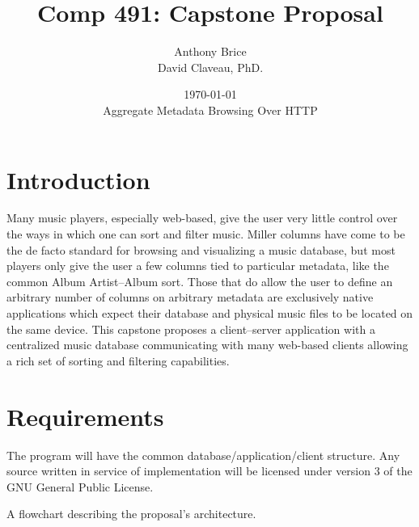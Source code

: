 \documentclass{abrice}
\title{Comp 491: Capstone Proposal}
\author{Anthony Brice\protect\\\medskip David Claveau, PhD.}
\date{\today\protect\\ \bigskip Aggregate Metadata Browsing Over HTTP}
\begin{document}
\maketitle

\section{Introduction}

Many music players, especially web-based, give the user very little control
over the ways in which one can sort and filter music. Miller columns have come
to be the de facto standard for browsing and visualizing a music database, but
most players only give the user a few columns tied to particular metadata, like
the common Album Artist--Album sort. Those that do allow the user to define an
arbitrary number of columns on arbitrary metadata are exclusively native
applications which expect their database and physical music files to be located
on the same device. This capstone proposes a client--server application with a
centralized music database communicating with many web-based clients allowing a
rich set of sorting and filtering capabilities.

\section{Requirements}

The program will have the common database/application/client structure. Any
source written in service of implementation will be licensed under version 3 of
the GNU General Public License.

\begin{marginfigure}\label{fig:arch}
  \centering
  \caption{A flowchart describing the proposal's architecture.}
\end{marginfigure}
\end{document}
